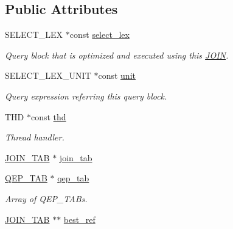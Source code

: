 \subsection*{Public Attributes}
\begin{DoxyCompactItemize}
\item 
\mbox{\label{classJOIN_a4d41e9f6535ca7cc781f9521a8d77655}} 
S\+E\+L\+E\+C\+T\+\_\+\+L\+EX $\ast$const \mbox{\hyperlink{classJOIN_a4d41e9f6535ca7cc781f9521a8d77655}{select\+\_\+lex}}
\begin{DoxyCompactList}\small\item\em Query block that is optimized and executed using this \mbox{\hyperlink{classJOIN}{J\+O\+IN}}. \end{DoxyCompactList}\item 
\mbox{\label{classJOIN_a80e1b946c275f9fdcdd48cf420db2d97}} 
S\+E\+L\+E\+C\+T\+\_\+\+L\+E\+X\+\_\+\+U\+N\+IT $\ast$const \mbox{\hyperlink{classJOIN_a80e1b946c275f9fdcdd48cf420db2d97}{unit}}
\begin{DoxyCompactList}\small\item\em Query expression referring this query block. \end{DoxyCompactList}\item 
\mbox{\label{classJOIN_aad08d5f16c8e6368ec5ece80d0c9a736}} 
T\+HD $\ast$const \mbox{\hyperlink{classJOIN_aad08d5f16c8e6368ec5ece80d0c9a736}{thd}}
\begin{DoxyCompactList}\small\item\em Thread handler. \end{DoxyCompactList}\item 
\mbox{\hyperlink{classJOIN__TAB}{J\+O\+I\+N\+\_\+\+T\+AB}} $\ast$ \mbox{\hyperlink{classJOIN_a0f4a3bf606f174303181a5c7d730bdbb}{join\+\_\+tab}}
\item 
\mbox{\label{classJOIN_a1c5675a6a8615860bb97887c472e0eae}} 
\mbox{\hyperlink{classQEP__TAB}{Q\+E\+P\+\_\+\+T\+AB}} $\ast$ \mbox{\hyperlink{classJOIN_a1c5675a6a8615860bb97887c472e0eae}{qep\+\_\+tab}}
\begin{DoxyCompactList}\small\item\em Array of Q\+E\+P\+\_\+\+T\+A\+Bs. \end{DoxyCompactList}\item 
\mbox{\hyperlink{classJOIN__TAB}{J\+O\+I\+N\+\_\+\+T\+AB}} $\ast$$\ast$ \mbox{\hyperlink{classJOIN_a5fa8910d3510d28caa7910981ed3a2e2}{best\+\_\+ref}}
$$
\end{DoxyCompactItemize}
